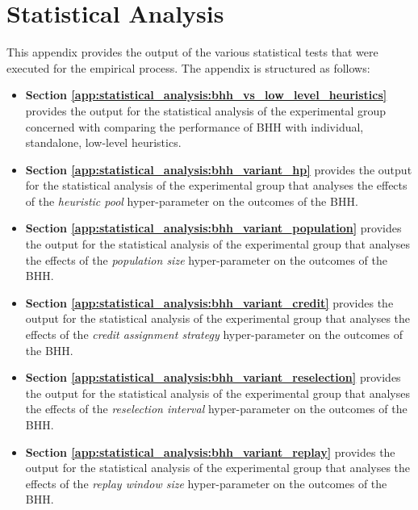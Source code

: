 \chapter{Statistical Analysis}
\label{app:statistical_analysis}

This appendix provides the output of the various statistical tests that were executed for the empirical process. The appendix is structured as follows:


\begin{itemize}
	\item \textbf{Section \ref{app:statistical_analysis:bhh_vs_low_level_heuristics}} provides the output for the statistical analysis of the experimental group concerned with comparing the performance of \acs{BHH} with individual, standalone, low-level heuristics.

	\item \textbf{Section \ref{app:statistical_analysis:bhh_variant_hp}} provides the output for the statistical analysis of the experimental group that analyses the effects of the \textit{heuristic pool} hyper-parameter on the outcomes of the \acs{BHH}.

	\item \textbf{Section \ref{app:statistical_analysis:bhh_variant_population}} provides the output for the statistical analysis of the experimental group that analyses the effects of the \textit{population size} hyper-parameter on the outcomes of the \acs{BHH}.

	\item \textbf{Section \ref{app:statistical_analysis:bhh_variant_credit}} provides the output for the statistical analysis of the experimental group that analyses the effects of the \textit{credit assignment strategy} hyper-parameter on the outcomes of the \acs{BHH}.

	\item \textbf{Section \ref{app:statistical_analysis:bhh_variant_reselection}} provides the output for the statistical analysis of the experimental group that analyses the effects of the \textit{reselection interval} hyper-parameter on the outcomes of the \acs{BHH}.

	\item \textbf{Section \ref{app:statistical_analysis:bhh_variant_replay}} provides the output for the statistical analysis of the experimental group that analyses the effects of the \textit{replay window size} hyper-parameter on the outcomes of the \acs{BHH}.


\end{itemize}
